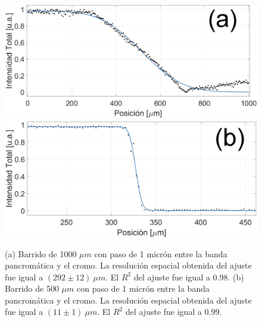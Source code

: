 \begin{figure}[H]
\hfill%
\includegraphics[scale=0.25]{Figs/microespectrometro/badresol.png}
\hfill%
\includegraphics[scale=0.25]{Figs/microespectrometro/goodresol.png}
\hfill%
\hfill%
\caption{(a) Barrido de 1000 $\mu m$ con paso de 1 micrón entre la banda pancromática y el cromo. La resolución espacial obtenida del ajuste fue igual a $(292 \pm 12)~ \mu m$. El $R^{2}$ del ajuste fue igual a 0.98. (b) Barrido de 500 $\mu m$ con paso de 1 micrón entre la banda pancromática y el cromo. La resolución espacial obtenida del ajuste fue igual a $(11 \pm 1)~ \mu m$. El $R^{2}$ del ajuste fue igual a 0.99.}
\label{fig:bgresol}
\end{figure}


